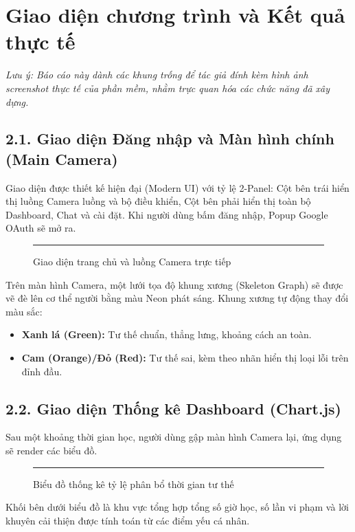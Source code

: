 \documentclass[12pt,a4paper]{report}
\begin{document}
\section{Giao diện chương trình và Kết quả thực tế}
\textit{Lưu ý: Báo cáo này dành các khung trống để tác giả đính kèm hình ảnh screenshot thực tế của phần mềm, nhằm trực quan hóa các chức năng đã xây dựng.}

\subsection{2.1. Giao diện Đăng nhập và Màn hình chính (Main Camera)}
Giao diện được thiết kế hiện đại (Modern UI) với tỷ lệ 2-Panel: Cột bên trái hiển thị luồng Camera luồng và bộ điều khiển, Cột bên phải hiển thị toàn bộ Dashboard, Chat và cài đặt. Khi người dùng bấm đăng nhập, Popup Google OAuth sẽ mở ra.

\begin{figure}[H]
    \centering
    \rule{0.9\textwidth}{8cm} %
    \caption{Giao diện trang chủ và luồng Camera trực tiếp}
\end{figure}

Trên màn hình Camera, một lưới tọa độ khung xương (Skeleton Graph) sẽ được vẽ đè lên cơ thể người bằng màu Neon phát sáng. Khung xương tự động thay đổi màu sắc:
\begin{itemize}
    \item \textbf{Xanh lá (Green):} Tư thế chuẩn, thẳng lưng, khoảng cách an toàn.
    \item \textbf{Cam (Orange)/Đỏ (Red):} Tư thế sai, kèm theo nhãn hiển thị loại lỗi trên đỉnh đầu.
\end{itemize}

\subsection{2.2. Giao diện Thống kê Dashboard (Chart.js)}
Sau một khoảng thời gian học, người dùng gập màn hình Camera lại, ứng dụng sẽ render các biểu đồ.

\begin{figure}[H]
    \centering
    \rule{0.9\textwidth}{8cm} %
    \caption{Biểu đồ thống kê tỷ lệ phân bổ thời gian tư thế}
\end{figure}
Khối bên dưới biểu đồ là khu vực tổng hợp tổng số giờ học, số lần vi phạm và lời khuyên cải thiện được tính toán từ các điểm yếu cá nhân.
\end{document}
